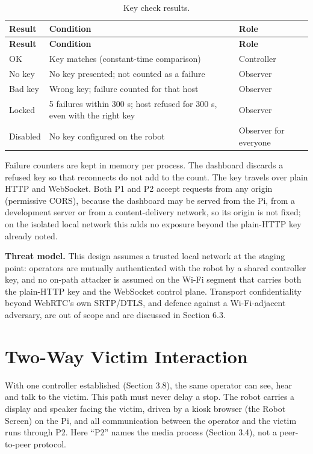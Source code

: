 \begin{center}
\begin{longtable}{|p{2.5cm}|p{5cm}|p{3cm}|}
\caption{Key check results.}
\label{tab:key-check} \\
\hline
\textbf{Result} & \textbf{Condition} & \textbf{Role} \\
\hline
\endfirsthead
\hline
\textbf{Result} & \textbf{Condition} & \textbf{Role} \\
\hline
\endhead
OK & Key matches (constant-time comparison) & Controller \\
\hline
No key & No key presented; not counted as a failure & Observer \\
\hline
Bad key & Wrong key; failure counted for that host & Observer \\
\hline
Locked & 5 failures within 300 s; host refused for 300 s, even with the right key & Observer \\
\hline
Disabled & No key configured on the robot & Observer for everyone \\
\hline
\end{longtable}
\end{center}

Failure counters are kept in memory per process. The dashboard discards a refused key so that reconnects do not add to the count. The key travels over plain HTTP and WebSocket. Both P1 and P2 accept requests from any origin (permissive CORS), because the dashboard may be served from the Pi, from a development server or from a content-delivery network, so its origin is not fixed; on the isolated local network this adds no exposure beyond the plain-HTTP key already noted.

\textbf{Threat model.} This design assumes a trusted local network at the staging point: operators are mutually authenticated with the robot by a shared controller key, and no on-path attacker is assumed on the Wi-Fi segment that carries both the plain-HTTP key and the WebSocket control plane. Transport confidentiality beyond WebRTC's own SRTP/DTLS, and defence against a Wi-Fi-adjacent adversary, are out of scope and are discussed in Section 6.3.

\section{Two-Way Victim Interaction}

With one controller established (Section 3.8), the same operator can see, hear and talk to the victim. This path must never delay a stop. The robot carries a display and speaker facing the victim, driven by a kiosk browser (the Robot Screen) on the Pi, and all communication between the operator and the victim runs through P2. Here ``P2'' names the media process (Section 3.4), not a peer-to-peer protocol.

